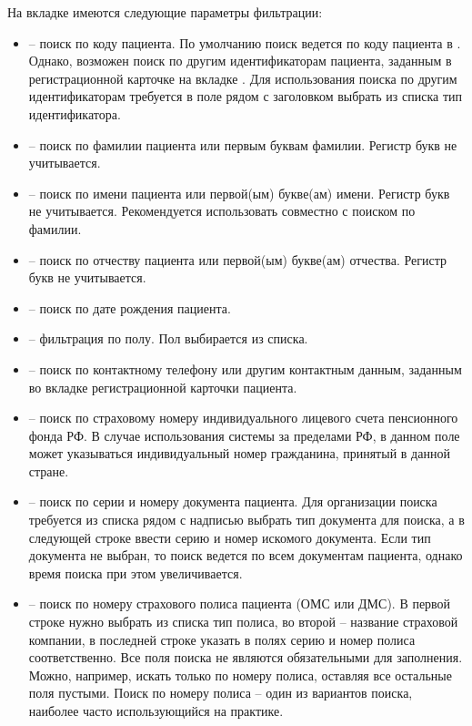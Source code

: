 На вкладке  имеются следующие параметры фильтрации:
\begin{itemize}
 \item {} – поиск по коду пациента. По умолчанию поиск ведется по коду пациента в \tmis. Однако, возможен поиск по другим идентификаторам пациента, заданным в регистрационной карточке на вкладке . Для использования поиска по другим идентификаторам требуется в поле рядом с заголовком  выбрать из списка тип идентификатора.
 \item {} – поиск по фамилии пациента или первым буквам фамилии. Регистр букв не учитывается.
 \item	{} – поиск по имени пациента или первой(ым) букве(ам) имени. Регистр букв не учитывается. Рекомендуется использовать совместно с поиском по фамилии.
 \item	{} – поиск по отчеству пациента или первой(ым) букве(ам) отчества. Регистр букв не учитывается.
 \item	{} – поиск по дате рождения пациента.
 \item	{} – фильтрация по полу. Пол выбирается из списка.
 \item {} – поиск по контактному телефону или другим контактным данным, заданным во вкладке  регистрационной карточки пациента.
 \item	{} – поиск по страховому номеру индивидуального лицевого счета пенсионного фонда РФ. В случае использования системы за пределами РФ, в данном поле может указываться индивидуальный номер гражданина, принятый в данной стране. 
 \item	{} – поиск по серии и номеру документа пациента. Для организации поиска требуется из списка рядом с надписью  выбрать тип документа для поиска, а в следующей строке ввести серию и номер искомого документа. Если тип документа не выбран, то поиск ведется по всем документам пациента, однако время поиска при этом увеличивается.
 \item	{} – поиск по номеру страхового полиса пациента (ОМС или ДМС). В первой строке нужно выбрать из списка тип полиса, во второй – название страховой компании, в последней строке указать в полях серию и номер полиса соответственно. Все поля поиска не являются обязательными для заполнения. Можно, например, искать только по номеру полиса, оставляя все остальные поля пустыми. Поиск по номеру полиса – один из вариантов поиска, наиболее часто использующийся на практике.

\end{itemize}
